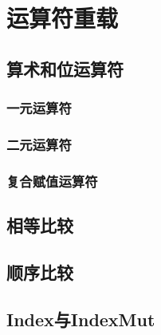 \chapter{运算符重载}\label{ch12}

\section{算术和位运算符}

\subsection{一元运算符}\label{unop}

\subsection{二元运算符}\label{biop}

\subsection{复合赋值运算符}\label{assign}

\section{相等比较}\label{equal}

\section{顺序比较}\label{cmp}

\section{Index与IndexMut}\label{index}
